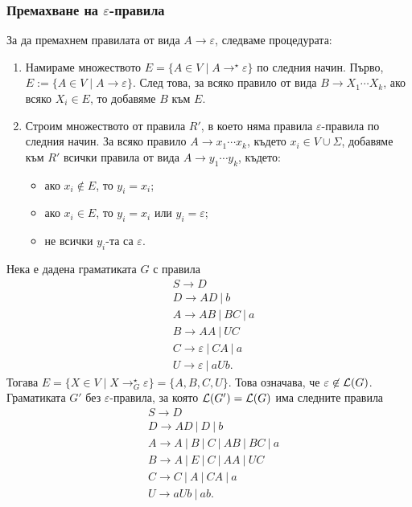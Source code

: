 \subsubsection*{Премахване на $\varepsilon$-правила}
За да премахнем правилата от вида $A \to \varepsilon$, следваме процедурата:
\begin{enumerate}[1)]
\item 
  Намираме множеството $E = \{A \in V \mid A \to^\star \varepsilon\}$ по следния начин.
  Първо, $E := \{A \in V \mid A \to \varepsilon\}$.
  След това, за всяко правило от вида $B \to X_1\cdots X_k$, 
  ако всяко $X_i \in E$, то добавяме $B$ към $E$.
\item
  Строим множеството от правила $R'$, в което няма правила $\varepsilon$-правила по следния начин.
  За всяко правило $A \to x_1\cdots x_k$, където $x_i \in V\cup\Sigma$,
  добавяме към $R'$ всички правила от вида $A \to y_1\cdots y_k$, където:
  \begin{itemize}[-]
  \item 
    ако $x_i \not\in E$, то $y_i = x_i$;
  \item
    ако $x_i \in E$, то $y_i = x_i$ или $y_i = \varepsilon$;
  \item
    не всички $y_i$-та са $\varepsilon$.
  \end{itemize}
\end{enumerate}

\begin{example}
  Нека е дадена граматиката $G$ с правила
  \begin{align*}
    & S \to D\\
    & D \to AD\ |\ b\\
    & A \to AB\ |\ BC\ |\ a\\
    & B \to AA\ |\ UC\\
    & C \to \varepsilon\ |\ CA\ |\ a\\
    & U \to \varepsilon\ |\ aUb.
  \end{align*}
  Тогава $E = \{X \in V \mid X \rightarrow^\star_G \varepsilon\} = \{A,B,C,U\}$.
  Това означава, че $\varepsilon \not\in \mathcal{L}(G)$.
  Граматиката $G'$ без $\varepsilon$-правила, за която $\mathcal{L}(G') = \mathcal{L}(G)$ има следните правила
  \begin{align*}
    & S \to D\\
    & D\to AD\ |\ D\ |\ b\\
    & A \to A\ |\ B\ |\ C\ |\ AB\ |\ BC\ |\ a\\
    & B\to A\ |\ E\ |\ C\ |\ AA\ |\ UC\\
    & C \to C\ |\ A\ |\ CA\ |\ a\\
    & U \to aUb\ |\ ab.
  \end{align*}
\end{example}

